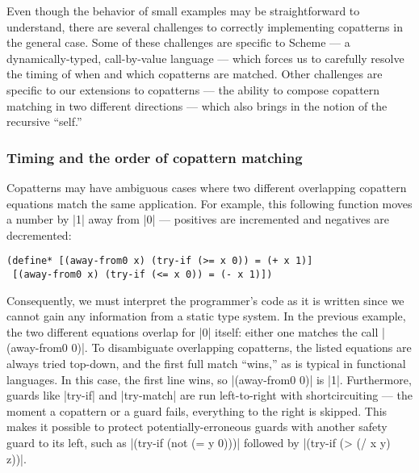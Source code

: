 Even though the behavior of small examples may be straightforward to understand, there are several challenges to correctly implementing copatterns in the general case.
Some of these challenges are specific to Scheme --- a dynamically-typed, call-by-value language --- which forces us to carefully resolve the timing of when and which copatterns are matched.
Other challenges are specific to our extensions to copatterns --- the ability to compose copattern matching in two different directions --- which also brings in the notion of the recursive ``self.''

\subsubsection{Timing and the order of copattern matching}
\label{sec:timing-challenges}

Copatterns may have ambiguous cases where two different overlapping copattern equations match the same application.
For example, this following function moves a number by \scm|1| away from \scm|0| --- positives are incremented and negatives are decremented:
\begin{verbatim}
(define* [(away-from0 x) (try-if (>= x 0)) = (+ x 1)]
 [(away-from0 x) (try-if (<= x 0)) = (- x 1)])
\end{verbatim}
Consequently, we must interpret the programmer's code as it is written since we cannot gain any information from a static type system.
In the previous example, the two different equations overlap for \scm|0| itself: either one matches the call \scm|(away-from0 0)|.
To disambiguate overlapping copatterns, the listed equations are always tried top-down, and the first full match ``wins,'' as is typical in functional languages.
In this case, the first line wins, so \scm|(away-from0 0)| is \scm|1|.
Furthermore, guards like \scm|try-if| and \scm|try-match| are run left-to-right with shortcircuiting --- the moment a copattern or a guard fails, everything to the right is skipped.
This makes it possible to protect potentially-erroneous guards with another safety guard to its left, such as \scm|(try-if (not (= y 0)))| followed by \scm|(try-if (> (/ x y) z))|.

